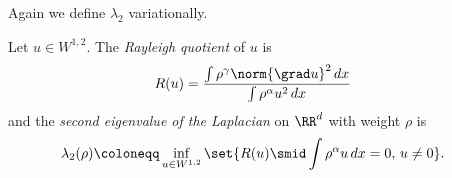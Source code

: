 Again we define $\lambda_2$ variationally.
\begin{definition}
Let $u\in W^{1,2}$. The \textit{Rayleigh quotient} of $u$ is
\begin{align*}
R(u) &= \frac{\int \rho^\gamma\norm{\grad u}^2\,dx}{\int \rho^\alpha u^2\,dx}
\end{align*}
and the \textit{second eigenvalue of the Laplacian} on $\RR^d$ with weight $\rho$ is
\begin{align*}
\lambda_2(\rho) &\coloneqq \inf_{u\in W^{1,2}}\set{R(u) \smid \int \rho^\alpha u \,dx = 0,\, u\neq 0}.
\end{align*}
\end{definition}



